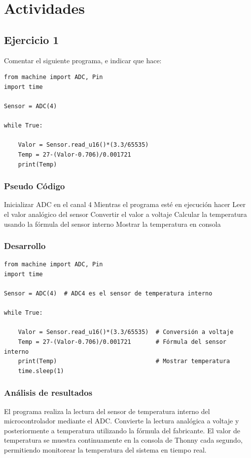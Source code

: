 \section{Actividades}

\subsection{Ejercicio 1}
Comentar el siguiente programa, e indicar que hace:

\begin{lstlisting}
from machine import ADC, Pin
import time

Sensor = ADC(4)

while True:
    
    Valor = Sensor.read_u16()*(3.3/65535)
    Temp = 27-(Valor-0.706)/0.001721
    print(Temp)
\end{lstlisting}

\subsubsection{Pseudo Código}

\begin{algorithm}[H]

\SetAlgoLined
\caption{Lectura de temperatura del sensor interno}

Inicializar ADC en el canal 4\;
Mientras el programa esté en ejecución hacer\;
\Indp
Leer el valor analógico del sensor\;
Convertir el valor a voltaje\;
Calcular la temperatura usando la fórmula del sensor interno\;
Mostrar la temperatura en consola\;
\Indm

\end{algorithm}

\subsubsection{Desarrollo}
\begin{lstlisting}
from machine import ADC, Pin
import time

Sensor = ADC(4)  # ADC4 es el sensor de temperatura interno

while True:
    
    Valor = Sensor.read_u16()*(3.3/65535)  # Conversión a voltaje
    Temp = 27-(Valor-0.706)/0.001721       # Fórmula del sensor interno
    print(Temp)                            # Mostrar temperatura
    time.sleep(1)
\end{lstlisting}

\subsubsection{Análisis de resultados}
El programa realiza la lectura del sensor de temperatura interno del microcontrolador mediante el ADC.
Convierte la lectura analógica a voltaje y posteriormente a temperatura utilizando la fórmula del fabricante.
El valor de temperatura se muestra continuamente en la consola de Thonny cada segundo, permitiendo monitorear la temperatura del sistema en tiempo real.

